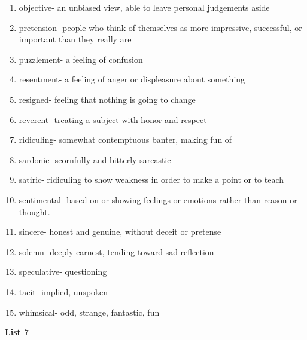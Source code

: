 \begin{enumerate}

\item objective- an unbiased view, able to leave personal judgements aside

\item pretension- people who think of themselves as more impressive, successful, or important than they really are

\item puzzlement- a feeling of confusion

\item resentment- a feeling of anger or displeasure about something

\item resigned- feeling that nothing is going to change

\item reverent- treating a subject with honor and respect

\item ridiculing- somewhat contemptuous banter, making fun of

\item sardonic- scornfully and bitterly sarcastic

\item satiric- ridiculing to show weakness in order to make a point or to teach

\item sentimental- based on or showing feelings or emotions rather than reason or thought. 

\item sincere- honest and genuine, without deceit or pretense

\item solemn- deeply earnest, tending toward sad reflection

\item speculative- questioning

\item tacit- implied, unspoken

\item whimsical- odd, strange, fantastic, fun

\end{enumerate}

\textbf{List 7}

